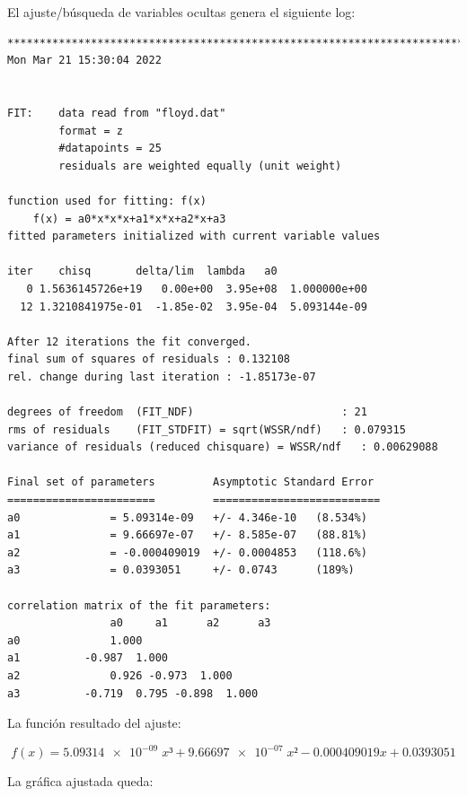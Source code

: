 \documentclass[12pt, spanish]{article}
\begin{document}
\newpage

El ajuste/búsqueda de variables ocultas genera el siguiente log:

\begin{verbatim}
************************************************************************
Mon Mar 21 15:30:04 2022


FIT:	data read from "floyd.dat"
    	format = z
    	#datapoints = 25
    	residuals are weighted equally (unit weight)

function used for fitting: f(x)
    f(x) = a0*x*x*x+a1*x*x+a2*x+a3
fitted parameters initialized with current variable values

iter  	chisq   	delta/lim  lambda   a0
   0 1.5636145726e+19   0.00e+00  3.95e+08	1.000000e+00
  12 1.3210841975e-01  -1.85e-02  3.95e-04	5.093144e-09

After 12 iterations the fit converged.
final sum of squares of residuals : 0.132108
rel. change during last iteration : -1.85173e-07

degrees of freedom	(FIT_NDF)                    	: 21
rms of residuals  	(FIT_STDFIT) = sqrt(WSSR/ndf)	: 0.079315
variance of residuals (reduced chisquare) = WSSR/ndf   : 0.00629088

Final set of parameters        	Asymptotic Standard Error
=======================        	==========================
a0          	= 5.09314e-09  	+/- 4.346e-10	(8.534%)
a1          	= 9.66697e-07  	+/- 8.585e-07	(88.81%)
a2          	= -0.000409019 	+/- 0.0004853	(118.6%)
a3          	= 0.0393051    	+/- 0.0743   	(189%)

correlation matrix of the fit parameters:
            	a0     a1      a2      a3
a0          	1.000
a1         	-0.987  1.000
a2          	0.926 -0.973  1.000
a3         	-0.719  0.795 -0.898  1.000
\end{verbatim}

\newpage

La función resultado del ajuste:

\[f(x)=\num{5.09314e-09}\;x³ + \num{9.66697e-07}\;x² - 0.000409019x + 0.0393051\]

La gráfica ajustada queda:
\end{document}
